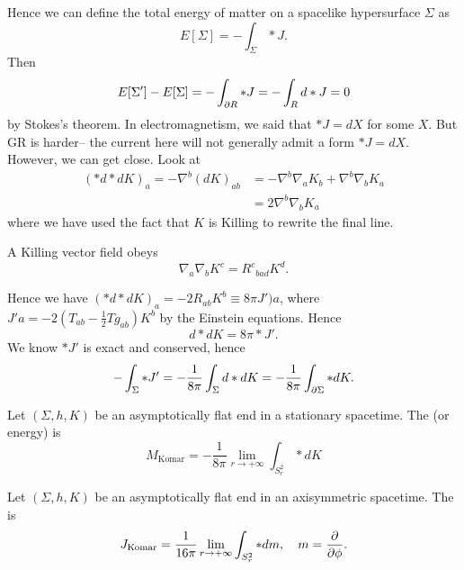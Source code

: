 Hence we can define the total energy of matter on a spacelike hypersurface $\Sigma$ as
\begin{equation}
    E[\Sigma]=-\int_\Sigma * J.
\end{equation}
Then
\begin{equation}
    E[\Sigma']-E[\Sigma]=-\int_{\p R} *J = -\int_R d* J = 0
\end{equation}
by Stokes's theorem. In electromagnetism, we said that $*J=dX$ for some $X$. But GR is harder-- the current here will not generally admit a form $*J=dX$. However, we can get close. Look at
\begin{align*}
    (*d*dK)_a = -\nabla^b(dK)_{ab}&=-\nabla^b \nabla_a K_b + \nabla^b \nabla_b K_a\\
    &= 2\nabla^b \nabla_b K_a
\end{align*}
where we have used the fact that $K$ is Killing to rewrite the final line.
\begin{lem}
    A Killing vector field obeys
    \begin{equation}
        \nabla_a \nabla_b K^c = R^c{}_{bad} K^d.
    \end{equation}
\end{lem}
Hence we have $(*d*d K)_a = -2R_{ab}K^b \equiv 8\pi J')a$,
where $J'a = -2(T_{ab}-\frac{1}{2}T g_{ab})K^b$ by the Einstein equations. Hence
\begin{equation}
    d*dK=8\pi * J'.
\end{equation}
We know $*J'$ is exact and conserved, hence
\begin{equation}
    -\int_\Sigma * J' = -\frac{1}{8\pi} \int_\Sigma d* dK = -\frac{1}{8\pi}\int_{\p \Sigma} *dK.
\end{equation}
\begin{defn}
    Let $(\Sigma,h,K)$ be an asymptotically flat end in a stationary spacetime. The  (or energy) is
    \begin{equation}
        M_{\text{Komar}}=-\frac{1}{8\pi} \lim_{r\to +\infty} \int_{S^2_r} * dK
    \end{equation}
\end{defn}
\begin{defn}
    Let $(\Sigma,h,K)$ be an asymptotically flat end in an axisymmetric spacetime. The  is
    \begin{equation}
        J_{\text{Komar}}=\frac{1}{16\pi} \lim_{r\to +\infty} \int_{S^2_r} *dm, \quad m=\P{}{\phi}.
    \end{equation}
\end{defn}
